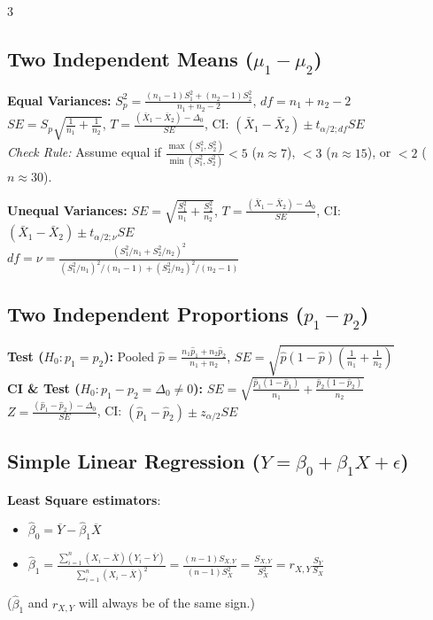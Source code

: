 \documentclass[10pt]{article}
\begin{document}
\begin{multicols}{3}
\subsection*{Two Independent Means ($\mu_1 - \mu_2$)}
\textbf{Equal Variances:} $S_p^2 = \frac{(n_1 - 1)S_1^2 + (n_2 - 1)S_2^2}{n_1 + n_2 - 2}$, \quad $df = n_1 + n_2 - 2$\\
$SE = S_p \sqrt{\frac{1}{n_1} + \frac{1}{n_2}}$, \quad $T = \frac{(\bar{X}_1 - \bar{X}_2) - \Delta_0}{SE}$, \quad CI: $(\bar{X}_1 - \bar{X}_2) \pm t_{\alpha/2; df} SE$\\
\textit{Check Rule:} Assume equal if $\frac{\max(S_1^2, S_2^2)}{\min(S_1^2, S_2^2)} < 5$ ($n\approx7$), $< 3$ ($n\approx15$), or $< 2$ ($n\approx30$).

\textbf{Unequal Variances:} $SE = \sqrt{\frac{S_1^2}{n_1} + \frac{S_2^2}{n_2}}$, \quad $T = \frac{(\bar{X}_1 - \bar{X}_2) - \Delta_0}{SE}$, \quad CI: $(\bar{X}_1 - \bar{X}_2) \pm t_{\alpha/2; \nu} SE$\\
$df = \nu = \frac{(S_1^2/n_1 + S_2^2/n_2)^2}{(S_1^2/n_1)^2/(n_1-1) + (S_2^2/n_2)^2/(n_2-1)}$

\subsection*{Two Independent Proportions ($p_1 - p_2$)}
\textbf{Test ($H_0: p_1=p_2$):} Pooled $\hat{p} = \frac{n_1\hat{p}_1 + n_2\hat{p}_2}{n_1 + n_2}$, \quad $SE = \sqrt{\hat{p}(1 - \hat{p})\left(\frac{1}{n_1} + \frac{1}{n_2}\right)}$\\
\textbf{CI \& Test ($H_0: p_1-p_2=\Delta_0 \neq 0$):} $SE = \sqrt{\frac{\hat{p}_1(1 - \hat{p}_1)}{n_1} + \frac{\hat{p}_2(1 - \hat{p}_2)}{n_2}}$\\
$Z = \frac{(\hat{p}_1 - \hat{p}_2) - \Delta_0}{SE}$, \quad CI: $(\hat{p}_1 - \hat{p}_2) \pm z_{\alpha/2} SE$

\subsection*{Simple Linear Regression ($Y = \beta_0 + \beta_1X + \epsilon$)}
\textbf{Least Square estimators}:
\begin{itemize}
    \item $\hat{\beta}_0 = \overline{Y} - \hat{\beta}_1 \overline{X}$
    \item $\hat{\beta}_1 = \frac{\sum_{i=1}^n (X_i - \overline{X})(Y_i - \overline{Y})}{\sum_{i=1}^n (X_i - \overline{X})^2} = \frac{(n-1)S_{X,Y}}{(n-1)S_X^2} = \frac{S_{X,Y}}{S_X^2} = r_{X,Y} \frac{S_Y}{S_X}$
\end{itemize}
($\hat{\beta}_1$ and $r_{X,Y}$ will always be of the same sign.)


\end{multicols}
\end{document}
